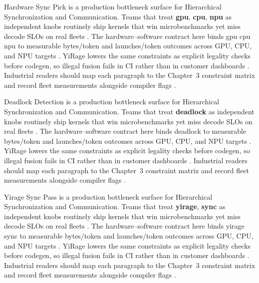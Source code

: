 Hardware Sync Pick is a production bottleneck surface for Hierarchical Synchronization and Communication. Teams that treat \textbf{gpu}, \textbf{cpu}, \textbf{npu} as independent knobs routinely ship kernels that win microbenchmarks yet miss decode SLOs on real fleets \citep{amd2024xdna,dao2022flashattention}. The hardware--software contract here binds gpu cpu npu to measurable bytes/token and launches/token outcomes across GPU, CPU, and NPU targets \citep{amd2024aie,kwon2023vllm}. YiRage lowers the same constraints as explicit legality checks before codegen, so illegal fusion fails in CI rather than in customer dashboards \citep{dlbook,nvidia2024cudagraphs}. Industrial readers should map each paragraph to the Chapter~3 constraint matrix and record fleet measurements alongside compiler flags \citep{dao2022flashattention,liu2024deepseekv3}.

Deadlock Detection is a production bottleneck surface for Hierarchical Synchronization and Communication. Teams that treat \textbf{deadlock} as independent knobs routinely ship kernels that win microbenchmarks yet miss decode SLOs on real fleets \citep{amd2024aie,kwon2023vllm}. The hardware--software contract here binds deadlock to measurable bytes/token and launches/token outcomes across GPU, CPU, and NPU targets \citep{dlbook,nvidia2024cudagraphs}. YiRage lowers the same constraints as explicit legality checks before codegen, so illegal fusion fails in CI rather than in customer dashboards \citep{dao2022flashattention,liu2024deepseekv3}. Industrial readers should map each paragraph to the Chapter~3 constraint matrix and record fleet measurements alongside compiler flags \citep{kwon2023vllm,patel2025llminference}.

Yirage Sync Pass is a production bottleneck surface for Hierarchical Synchronization and Communication. Teams that treat \textbf{yirage}, \textbf{sync} as independent knobs routinely ship kernels that win microbenchmarks yet miss decode SLOs on real fleets \citep{dlbook,nvidia2024cudagraphs}. The hardware--software contract here binds yirage sync to measurable bytes/token and launches/token outcomes across GPU, CPU, and NPU targets \citep{dao2022flashattention,liu2024deepseekv3}. YiRage lowers the same constraints as explicit legality checks before codegen, so illegal fusion fails in CI rather than in customer dashboards \citep{kwon2023vllm,patel2025llminference}. Industrial readers should map each paragraph to the Chapter~3 constraint matrix and record fleet measurements alongside compiler flags \citep{nvidia2024cudagraphs,taxbreak2026}.


